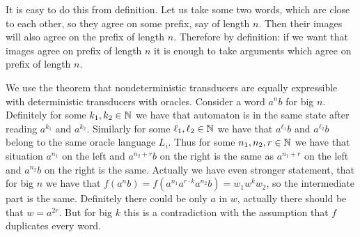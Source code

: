 
{
}





{
It is easy to do this from definition. Let us take some two words, which are close to each other, so they agree on some
prefix, say of length $n$. Then their images will also agree on the prefix of length $n$. Therefore by definition: if we want
that images agree on prefix of length $n$ it is enough to take arguments which agree on prefix of length $n$.
}

{

}


{

}


{
We use the theorem that nondeterministic transducers are equally expressible with deterministic transducers with oracles.
Consider a word $a^n b$ for big $n$. Definitely for some $k_1, k_2 \in \mathbb{N}$ we have that automaton is in the same
state after reading $a^{k_1}$ and $a^{k_2}$. Similarly for some $\ell_1, \ell_2 \in \mathbb{N}$ we have that $a^{\ell_1} b$ and
$a^{\ell_2} b$ belong to the same oracle language $L_i$. Thus for some $n_1, n_2, r \in \mathbb{N}$ we have that
situation $a^{n_1}$ on the left and $a^{n_2+r} b$ on the right is the same as $a^{n_1 + r}$ on the left and $a^{n_2} b$ on the
right is the same. Actually we have even stronger statement, that for big $n$ we have that
$f(a^n b) = f(a^{n_1} a^{r \cdot k} a^{n_2} b) = w_1 w^k w_2$, so the intermediate part is the same.
Definitely there could be only $a$ in $w$, actually there should be that $w = a^{2r}$.
But for big $k$ this is a contradiction with the assumption that $f$ duplicates every word.
}


